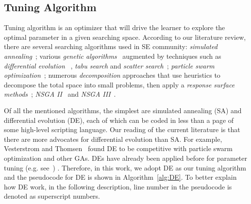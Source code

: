 \subsection{Tuning Algorithm}

Tuning algorithm is an optimizer that will drive the learner to explore
the optimal parameter in a given searching space. According to our
literature review, there are several searching algorithms used in 
SE community:{\em 
simulated annealing}~\cite{feather2002converging,menzies2007data};
 various {\em genetic algorithms}~\cite{jones1996automatic,harman2007current, arcuri2011parameter} augmented by
techniques such as {\em differential evolution}
~\cite{storn1997differential, fu2016tuning, fu2016differential,chaves2015differential,agrawal2016wrong}, 
{\em tabu search} and {\em scatter search}~\cite{beausoleil2006moss,molina2007sspmo,corazza2013using};
{\em particle swarm optimization}~\cite{windisch2007applying}; 
numerous {\em decomposition} approaches that use
    heuristics to decompose the total space into   small problems,   then apply a
    {\em response surface methods}~\cite{krall2015gale};
     {\em NSGA II} ~\cite{zhang2007multi}and {\em NSGA III}~\cite{mkaouer2014high}.


Of all the mentioned algorithms,  the simplest are simulated annealing (SA)  and 
differential evolution (DE), each of which can be coded in less than a page of some high-level scripting language.
 Our reading of the current literature is that there are more  advocates for
differential evolution than SA. For example,  Vesterstrom and Thomsen~\cite{Vesterstrom04} found DE to be competitive with 
 particle swarm optimization and other GAs.  DEs have already been applied before for 
 parameter tuning (e.g. see~\cite{omran2005differential, chiha2012tuning, fu2016tuning, fu2016differential, agrawal2016wrong}) .
Therefore, in this work, we adopt DE as our tuning algorithm and 
the pseudocode for DE is shown in Algorithm~\ref{alg:DE}.
To better explain how DE work, in the following description, 
line number in the pseudocode is denoted as superscript numbers.

